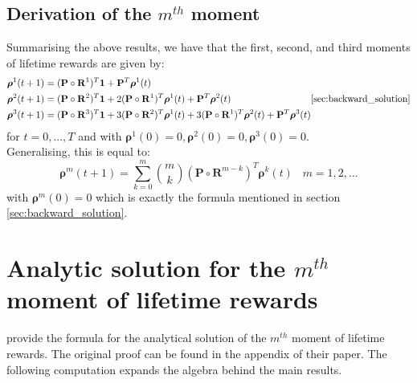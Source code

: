 \documentclass[\main/main.tex]{subfiles}
\begin{document}
\tocless\subsection{Derivation of the $m^{th}$ moment}

Summarising the above results, we have that the first, second, and third moments of lifetime rewards are given by:
\begin{equation}
    \begin{split}
     \bm{\rho}^1(t+1) &= (\mathbf{P} \circ \mathbf{R}^1) ^T\mathbf{1} + \mathbf{P}^T \bm{\rho}^1(t) \\
      \bm{\rho}^2(t+1) &= (\mathbf{P} \circ \mathbf{R}^2) ^ T\mathbf{1} + 2 (\mathbf{P} \circ \mathbf{R}^1) ^T \bm{\rho}^1(t) + 
      \mathbf{P}^T \bm{\rho}^2(t) \\
     \bm{\rho}^3(t+1) &= (\mathbf{P} \circ \mathbf{R}^3) ^ T\mathbf{1} + 3 (\mathbf{P} \circ \mathbf{R}^2) ^T \bm{\rho}^1(t) + 3 (\mathbf{P} \circ \mathbf{R}^1) ^T \bm{\rho}^2(t) + \mathbf{P}^T \bm{\rho}^3(t) \\
\end{split}\ref{sec:backward_solution}
\end{equation}for $t=0, ... ,T$ and with $\bm{\rho}^1(0) = 0, \bm{\rho}^2(0) = 0,\bm{\rho}^3(0) = 0$.\\
Generalising, this is equal to:
\begin{equation}\label{recursive}
    \bm{\rho}^m(t+1) = \sum_{k=0}^{m} {m \choose k} (\mathbf{P} \circ \mathbf{R}^{m-k}) ^ T \bm{\rho}^k(t) \;\; \; m=1,2,...
\end{equation}
with $\bm{\rho}^m(0)=0$ which is exactly the formula mentioned in section \ref{sec:backward_solution}.\\


\tocless\section{Analytic solution for the $m^{th}$ moment of lifetime rewards}\label{sec:analytical_solution}

\cite{VanDaalen2017} provide the formula for the analytical solution of the $m^{th}$ moment of lifetime rewards. The original proof can be found in the appendix of their paper. The following computation expands the algebra behind the main results.\\
\end{document}
